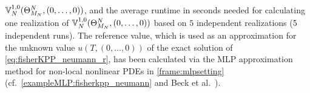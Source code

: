 $
{\mathbb{V}}^{1,0}_N(\Theta^N_{M_N},\allowbreak (0,\ldots,0))
$,
and the average runtime in seconds needed for calculating one realization of $
{\mathbb{V}}^{1,0}_N(\Theta^N_{M_N},\allowbreak (0,\ldots,0))
$
%
based on $5$ independent realizations (5 independent runs).
%
The reference value, which is used as an approximation for the unknown value $u(T,(0,\ldots,0))$ of the exact solution of \eqref{eq:fisherKPP_neumann_r}, has been calculated via the MLP approximation method for non-local nonlinear PDEs in \cref{frame:mlpsetting} (cf.~\cref{exampleMLP:fisherkpp_neumann} and Beck et al.~\citep[Remark~3.3]{Beck2017a}).

